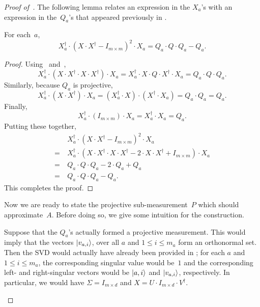 \begin{proof}[Proof of~]
The following lemma relates an expression in the $X_a$'s
with an expression in the~$Q_a$'s that appeared previously in .

\begin{lemma}\label{lem:X-expression-to-Q-expression}
For each~$a$,
\begin{equation*}
X_a^\dagger \cdot (X \cdot X^\dagger - I_{m \times m})^2 \cdot X_a
= Q_a \cdot Q \cdot Q_a - Q_a.
\end{equation*}
\end{lemma}
\begin{proof}
Using~ and~,
\begin{equation*}
X_a^\dagger \cdot (X \cdot X^\dagger \cdot X \cdot X^\dagger) \cdot X_a
= X_a^\dagger \cdot X \cdot Q \cdot X^\dagger \cdot X_a
= Q_a \cdot Q \cdot Q_a.
\end{equation*}
Similarly, because $Q_a$ is projective,
\begin{equation*}
X_a^\dagger \cdot (X \cdot X^\dagger) \cdot X_a
= (X_a^\dagger \cdot X) \cdot (X^\dagger \cdot X_a)
= Q_a \cdot Q_a
= Q_a.
\end{equation*}
Finally,
\begin{equation*}
X_a^\dagger \cdot (I_{m \times m}) \cdot X_a
= X_a^\dagger \cdot X_a = Q_a.
\end{equation*}
Putting these together,
\begin{align*}
&X_a^\dagger \cdot (X \cdot X^\dagger - I_{m \times m})^2 \cdot X_a\\
 =~& X_a^\dagger \cdot (X \cdot X^\dagger \cdot X \cdot X^\dagger  - 2 \cdot X\cdot X^\dagger + I_{m \times m}) \cdot X_a\\
    =~& Q_a \cdot Q \cdot Q_a  - 2 \cdot Q_a  + Q_a\\
    =~& Q_a \cdot Q \cdot Q_a  -  Q_a.
\end{align*}
This completes the proof.
\end{proof}

Now we are ready to state the projective sub-measurement~$P$
which should approximate~$A$.
Before doing so, we give some intuition for the construction.

\begin{remark}
Suppose that the $Q_a$'s actually formed a projective measurement.
This would imply that the vectors $\ket{v_{a, i}}$, over all $a$ and $1 \leq i \leq m_a$ form an orthonormal set.
Then the SVD would actually have already been provided in ;
for each $a$ and $1 \leq i \leq m_a$,
the corresponding singular value would be~$1$ and the corresponding left- and right-singular vectors would be $\ket{a, i}$ and $\ket{v_{a, i}}$, respectively.
In particular, we would have $\Sigma = I_{m \times d}$ and $X = U \cdot I_{m \times d}\cdot V^\dagger$.
\end{remark}


\end{proof}
